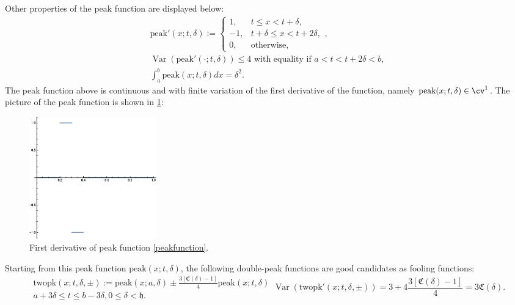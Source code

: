 \documentclass{iitthesis}
\DeclareMathOperator{\Var}{Var}
\theoremstyle{definition}
\theoremstyle{remark}
\begin{document}
Other properties of the peak function are displayed below:
\begin{gather*}
  \text{peak}'(x;t,\delta):= \begin{cases} \displaystyle 1, & t \le x < t+\delta,\\[1ex]
\displaystyle -1, & t+\delta \le x < t+2\delta,\\[1ex]
\displaystyle  0, & \text{otherwise},
\end{cases}, \\
\Var(\text{peak}'(\cdot;t,\delta))\le 4 \text{ with equality if } a<t<t+2\delta<b, \\
\int_{a}^{b}\text{peak}(x;t,\delta)dx=\delta^2.
\end{gather*}
The peak function above is continuous and with finite variation of the first derivative of the function, namely $\text{peak}(x;t,\delta)\in\cv^1$. The picture of the peak function is shown in \ref{fig:peakp1}:
\begin{figure}[ht]
\centering
\includegraphics[width=5.5cm]{peakp1.eps}
\caption{First derivative of peak function \ref{peakfunction}. \label{fig:peakp1}}
\end{figure}
Starting from this peak function $\text{peak}(x;t,\delta)$, the following double-peak functions are good candidates as fooling functions:
\begin{subequations}
    \begin{multline}\label{foolingfunctiontrap}
        \text{twopk}(x;t,\delta,\pm):=\text{peak}(x;a,\mathfrak{\delta})\pm\frac{3[\mathfrak{C}(\delta)-1]}{4}\text{peak}(x;t,\delta)\\ a+3\mathfrak{\delta}\le t \le b-3\delta, 0\le \delta <\mathfrak{h}.
    \end{multline}
    \begin{equation}
        \Var(\text{twopk}'(x;t,\delta,\pm))=3+4\frac{3[\mathfrak{C}(\delta)-1]}{4}=3\mathfrak{C}(\delta).
    \end{equation}
\end{subequations}
\end{document}
